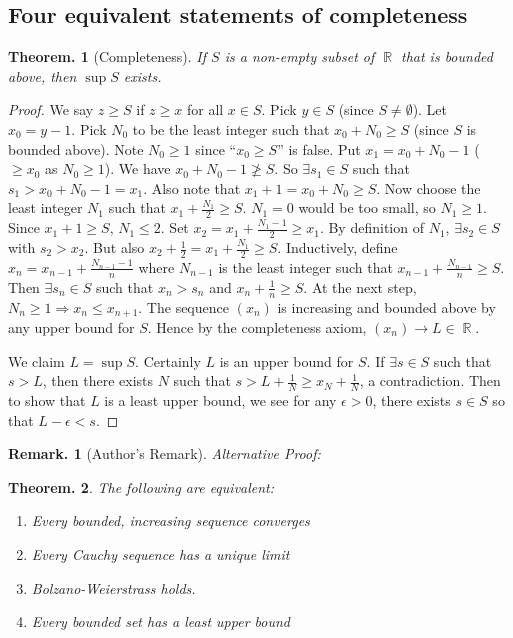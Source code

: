 \documentclass[11pt, a4paper]{memoir}
\DeclareMathOperator{\R}{{\mathbb{R}}}
\theoremstyle{change}
\newtheorem{theorem}{Theorem.}[section]
\theoremstyle{plain}
\theoremstyle{nonumberplain}
\newtheorem{remark}{Remark.}
\newtheorem{proof}{Proof}
\numberwithin{equation}{section}
\begin{document}
\subsection{Four equivalent statements of completeness}
\begin{theorem}[Completeness]
    If $S$ is a non-empty subset of $\R$ that is bounded above, then $\sup S$ exists.
\end{theorem}
\begin{proof}
    We say $z\geq S$ if $z\geq x$ for all $x\in S$. Pick $y\in S$ (since $S\neq\emptyset$). Let $x_0=y-1$. Pick $N_0$ to
    be the least integer such that $x_0+N_0\geq S$ (since $S$ is bounded above). Note $N_0\geq 1$ since ``$x_0\geq S$''
    is false. Put $x_1=x_0+N_0-1$ ($\geq x_0$ as $N_0\geq 1$). We have $x_0+N_0-1\not\geq S$. So $\exists s_1\in S$ such
    that $s_1>x_0+N_0-1=x_1$. Also note that $x_1+1=x_0+N_0\geq S$. Now choose the least integer $N_1$ such that $x_1+\frac{N_1}{2}\geq S$.
    $N_1=0$ would be too small, so $N_1\geq 1$. Since $x_1+1\geq S$, $N_1\leq 2$. Set $x_2=x_1+\frac{N_1-1}{2}\geq x_1$.
    By definition of $N_1$, $\exists s_2\in S$ with $s_2>x_2$. But also $x_2+\frac{1}{2}=x_1+\frac{N_1}{2}\geq S$.
    Inductively, define $x_n=x_{n-1}+\frac{N_{n-1}-1}{n}$ where $N_{n-1}$ is the least integer such that $x_{n-1}+\frac{N_{n-1}}{n}\geq S$.
    Then $\exists s_n\in S$ such that $x_n>s_n$ and $x_n+\frac{1}{n}\geq S$. At the next step, $N_n\geq 1\Rightarrow x_n\leq x_{n+1}$.
    The sequence $(x_n)$ is increasing and bounded above by any upper bound for $S$. Hence by the completeness axiom,
    $(x_n)\to L\in\R$.

    We claim $L=\sup S$. Certainly $L$ is an upper bound for $S$. If $\exists s\in S$ such that $s>L$, then there exists
    $N$ such that $s>L+\frac{1}{N}\geq x_N+\frac{1}{N}$, a contradiction. Then to show that $L$ is a least upper bound,
    we see for any $\epsilon>0$, there exists $s\in S$ so that $L-\epsilon<s$.
\end{proof}
\begin{remark}[Author's Remark]
    \textit{Alternative Proof:}
\end{remark}
\begin{theorem}
    The following are equivalent:
    \begin{enumerate}
        \item Every bounded, increasing sequence converges
        \item Every Cauchy sequence has a unique limit
        \item Bolzano-Weierstrass holds.
        \item Every bounded set has a least upper bound
    \end{enumerate}
\end{theorem}
\end{document}

